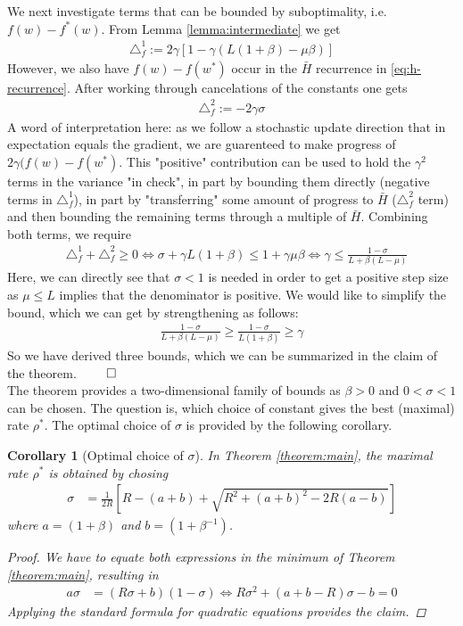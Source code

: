 \documentclass{article}
\newtheorem{corollary}{Corollary}
\begin{document}
We next investigate terms that can be bounded by suboptimality, i.e.~$f(w)-f^*(w)$.  From Lemma \ref{lemma:intermediate} we get 
\begin{align}
\triangle_f^1 := 2 \gamma \left[ 1- \gamma  (L (1+\beta)  -  \mu \beta) \right] 
\end{align}
%
However, we also have $f(w)-f(w^*)$ occur in the $\bar H$ recurrence in \eqref{eq:h-recurrence}. After working through cancelations of the constants one gets
\begin{align}
\triangle_f^2 := -2 \gamma \sigma 
\end{align}
A word of interpretation here: as we follow a stochastic update direction that in expectation equals the gradient, we are guarenteed to make progress of $2\gamma (f(w)-f(w^*)$.  This "positive" contribution can be used to hold the $\gamma^2$ terms in the variance "in check", in part by bounding them directly (negative terms in  $\triangle_f^1$), in part by "transferring" some amount of progress to $\bar H$ ($\triangle_f^2$ term) and then bounding the remaining terms through a multiple of $\bar H$. Combining both terms, we require 
\begin{align}
& \triangle_f^1 + \triangle_f^2 \ge 0 \iff 
\sigma+  \gamma L (1 + \beta) 
\le 1 + \gamma \mu \beta \iff 
\gamma \leq \frac{1 - \sigma}{L + \beta (L-\mu)}
\label{eq:step-bound-from-sub}
\end{align}
Here, we can directly see that $\sigma<1$ is needed in order to get a positive step size as $\mu \leq L$ implies that the denominator is positive. We would like to simplify the bound, which we can get by strengthening as follows: 
\begin{align}
\frac{1 - \sigma}{L + \beta (L-\mu)} \geq \frac{1-\sigma}{L(1+\beta)}\ge \gamma
\end{align}
%
So we have derived three bounds, which we can be summarized in the claim of the theorem. $\qed$\\

The theorem provides a two-dimensional family of bounds as $\beta>0$ and $0 < \sigma <1$ can be chosen. The question is, which choice of constant gives the best (maximal) rate $\rho^*$. The optimal choice of $\sigma$ is provided by the following corollary.
\begin{corollary}[Optimal choice of $\sigma$]
In Theorem \ref{theorem:main}, the maximal rate $\rho^*$ is obtained by chosing
\begin{align}
\sigma & = \frac{1}{2R} \left[ R-(a+b) + \sqrt{R^2 + (a+b)^2 - 2R(a-b)} \right] 
\end{align}
where $a=(1+\beta)$ and $b= (1+\beta^{-1})$. 
\begin{proof}
We have to equate both expressions in the minimum of Theorem \ref{theorem:main}, resulting in 
\begin{align}
a \sigma & = ( R \sigma + b) (1-\sigma) \iff R \sigma^2 + (a+b-R) \sigma - b =0
\end{align}
Applying the standard formula for quadratic equations provides the claim. 
\end{proof}
\end{corollary}
\end{document}
